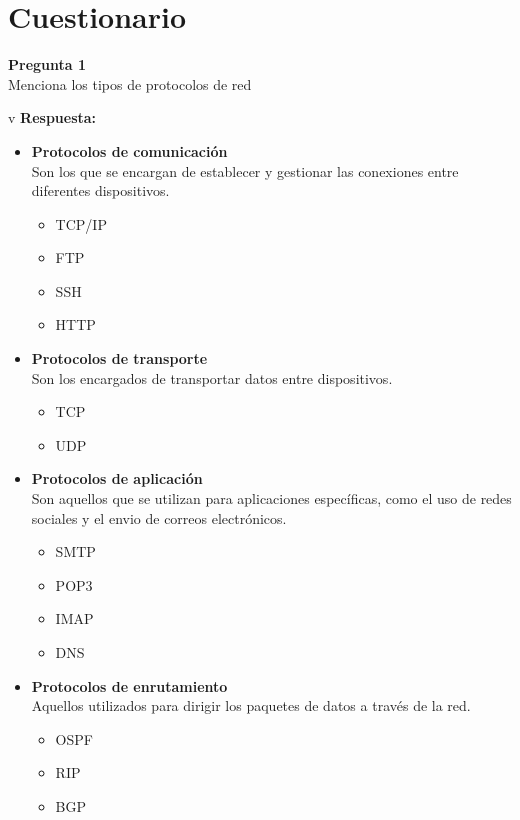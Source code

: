 \documentclass{article}
\newenvironment{problem}[2][Pregunta]
    { \begin{mdframed}[backgroundcolor=gray!20] \textbf{#1 #2} \\}
    {  \end{mdframed}}
\newenvironment{solution}
    {\textbf{Respuesta:\\}}
    {}
\begin{document}
\tableofcontents

\section{Cuestionario}

\begin{problem}
    {1} Menciona los tipos de protocolos de red
\end{problem}
v
\begin{solution}
    \begin{itemize}
        \item \textbf{Protocolos de comunicación} \\
        Son los que se encargan de establecer y gestionar las conexiones entre diferentes dispositivos.
        \begin{itemize}
            \item TCP/IP
            \item FTP
            \item SSH
            \item HTTP
        \end{itemize}

        \item \textbf{Protocolos de transporte}\\
        Son los encargados de transportar datos entre dispositivos.
        \begin{itemize}
            \item TCP
            \item UDP
        \end{itemize}

        \item \textbf{Protocolos de aplicación}\\
        Son aquellos que se utilizan para aplicaciones específicas, como el uso de redes sociales y el envio de correos electrónicos.
        \begin{itemize}
            \item SMTP
            \item POP3
            \item IMAP
            \item DNS
        \end{itemize}

        \item \textbf{Protocolos de enrutamiento}\\
        Aquellos utilizados para dirigir los paquetes de datos a través de la red.
        \begin{itemize}
            \item OSPF
            \item RIP
            \item BGP
        \end{itemize}


\end{itemize}
\end{solution}
\end{document}
